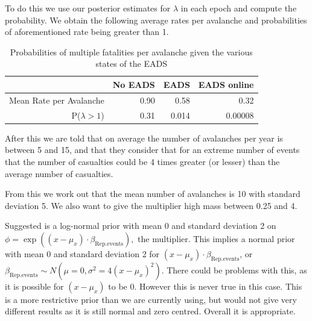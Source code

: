 \documentclass[10pt]{extarticle}
\begin{document}
To do this we use our posterior estimates for $\lambda$ in each epoch and compute the probability. We obtain the following average rates per avalanche and probabilities of aforementioned rate being greater than 1.

\begin{table}[ht]
	\centering
\begin{tabular}{r|rrr}
	\hline
	& No EADS & EADS & EADS online \\
	\hline
	Mean Rate per Avalanche& 0.90 & 0.58 & 0.32 \\
	P($\lambda > 1$) & 0.31 & 0.014 & 0.00008\\
	\hline
\end{tabular}
\caption{Probabilities of multiple fatalities per avalanche given the various states of the EADS}
\label{tab:probmdpa}
\end{table}

After this we are told that on average the number of avalanches per year is between 5 and 15, and that they consider that for an extreme number of events that the number of casualties could be 4 times greater (or lesser) than the average number of casualties. 

From this we work out that the mean number of avalanches is 10 with standard deviation 5. We also want to give the multiplier high mass between 0.25 and 4. 

Suggested is a log-normal prior with mean 0 and standard deviation 2 on $\phi = \exp((x-\mu_x)\cdot\beta_{\mathrm{Rep.events}}),$ the multiplier. This implies a normal prior with mean 0 and standard deviation 2 for $(x-\mu_x)\cdot\beta_{\mathrm{Rep.events}}$, or $\beta_{\mathrm{Rep.events}} \sim N(\mu = 0, \sigma^2 = 4(x-\mu_x)^2).$ There could be problems with this, as it is possible for $(x-\mu_x)$ to be 0. However this is never true in this case. This is a more restrictive prior than we are currently using, but would not give very different results as it is still normal and zero centred. Overall it is appropriate.

\end{document}
